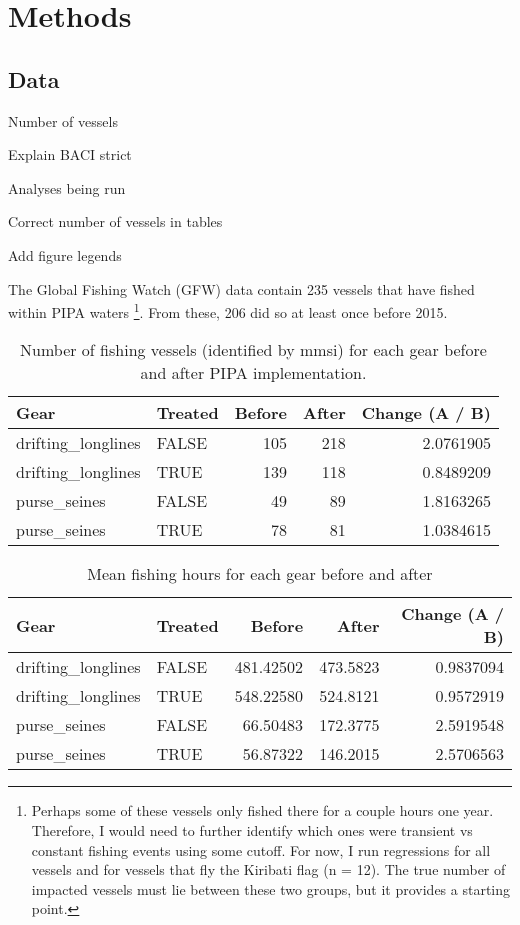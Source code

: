 \documentclass[]{article}
\let\rmarkdownfootnote\footnote%
\def\footnote{\protect\rmarkdownfootnote}
\theoremstyle{definition}
\theoremstyle{definition}
\theoremstyle{definition}
\theoremstyle{remark}
\begin{document}
\section{Methods}\label{methods}

\subsection{Data}\label{data}

Number of vessels

Explain BACI strict

Analyses being run

Correct number of vessels in tables

Add figure legends

The Global Fishing Watch (GFW) data contain 235 vessels that have fished
within PIPA waters \footnote{Perhaps some of these vessels only fished
  there for a couple hours one year. Therefore, I would need to further
  identify which ones were transient vs constant fishing events using
  some cutoff. For now, I run regressions for all vessels and for
  vessels that fly the Kiribati flag (n = 12). The true number of
  impacted vessels must lie between these two groups, but it provides a
  starting point.}. From these, 206 did so at least once before 2015.

\begin{table}

\caption{\label{tab:unnamed-chunk-33}Number of fishing vessels (identified by mmsi) for each gear before and after PIPA implementation.}
\centering
\begin{tabular}[t]{l|l|r|r|r}
\hline
Gear & Treated & Before & After & Change (A / B)\\
\hline
drifting\_longlines & FALSE & 105 & 218 & 2.0761905\\
\hline
drifting\_longlines & TRUE & 139 & 118 & 0.8489209\\
\hline
purse\_seines & FALSE & 49 & 89 & 1.8163265\\
\hline
purse\_seines & TRUE & 78 & 81 & 1.0384615\\
\hline
\end{tabular}
\end{table}

\begin{table}

\caption{\label{tab:unnamed-chunk-34}Mean fishing hours for each gear before and after}
\centering
\begin{tabular}[t]{l|l|r|r|r}
\hline
Gear & Treated & Before & After & Change (A / B)\\
\hline
drifting\_longlines & FALSE & 481.42502 & 473.5823 & 0.9837094\\
\hline
drifting\_longlines & TRUE & 548.22580 & 524.8121 & 0.9572919\\
\hline
purse\_seines & FALSE & 66.50483 & 172.3775 & 2.5919548\\
\hline
purse\_seines & TRUE & 56.87322 & 146.2015 & 2.5706563\\
\hline
\end{tabular}
\end{table}
\end{document}
